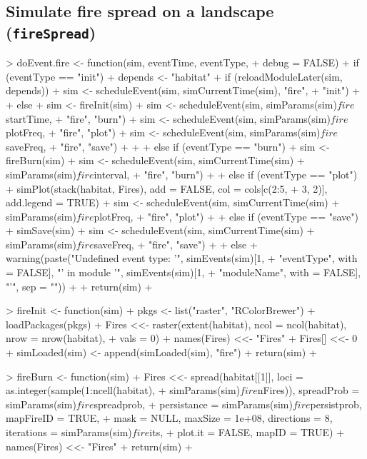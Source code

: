 \documentclass{article}
\begin{document}
\newpage

\subsection{Simulate fire spread on a landscape (\texttt{fireSpread})}

\begin{Schunk}
\begin{Soutput}
> doEvent.fire <- function(sim, eventTime, eventType, 
+     debug = FALSE) {
+     if (eventType == "init") {
+         depends <- "habitat"
+         if (reloadModuleLater(sim, depends)) {
+             sim <- scheduleEvent(sim, simCurrentTime(sim), "fire", 
+                 "init")
+         }
+         else {
+             sim <- fireInit(sim)
+             sim <- scheduleEvent(sim, simParams(sim)$fire$startTime, 
+                 "fire", "burn")
+             sim <- scheduleEvent(sim, simParams(sim)$fire$plotFreq, 
+                 "fire", "plot")
+             sim <- scheduleEvent(sim, simParams(sim)$fire$saveFreq, 
+                 "fire", "save")
+         }
+     }
+     else if (eventType == "burn") {
+         sim <- fireBurn(sim)
+         sim <- scheduleEvent(sim, simCurrentTime(sim) + simParams(sim)$fire$interval, 
+             "fire", "burn")
+     }
+     else if (eventType == "plot") {
+         simPlot(stack(habitat, Fires), add = FALSE, col = cols[c(2:5, 
+             3, 2)], add.legend = TRUE)
+         sim <- scheduleEvent(sim, simCurrentTime(sim) + simParams(sim)$fire$plotFreq, 
+             "fire", "plot")
+     }
+     else if (eventType == "save") {
+         simSave(sim)
+         sim <- scheduleEvent(sim, simCurrentTime(sim) + simParams(sim)$fire$saveFreq, 
+             "fire", "save")
+     }
+     else {
+         warning(paste("Undefined event type: '", simEvents(sim)[1, 
+             "eventType", with = FALSE], "' in module '", simEvents(sim)[1, 
+             "moduleName", with = FALSE], "'", sep = ""))
+     }
+     return(sim)
+ }

> fireInit <- function(sim) {
+     pkgs <- list("raster", "RColorBrewer")
+     loadPackages(pkgs)
+     Fires <<- raster(extent(habitat), ncol = ncol(habitat), nrow = nrow(habitat), 
+         vals = 0)
+     names(Fires) <<- "Fires"
+     Fires[] <<- 0
+     simLoaded(sim) <- append(simLoaded(sim), "fire")
+     return(sim)
+ }

> fireBurn <- function(sim) {
+     Fires <<- spread(habitat[[1]], loci = as.integer(sample(1:ncell(habitat), 
+         simParams(sim)$fire$nFires)), spreadProb = simParams(sim)$fire$spreadprob, 
+         persistance = simParams(sim)$fire$persistprob, mapFireID = TRUE, 
+         mask = NULL, maxSize = 1e+08, directions = 8, iterations = simParams(sim)$fire$its, 
+         plot.it = FALSE, mapID = TRUE)
+     names(Fires) <<- "Fires"
+     return(sim)
+ }
\end{Soutput}
\end{Schunk}
\end{document}
